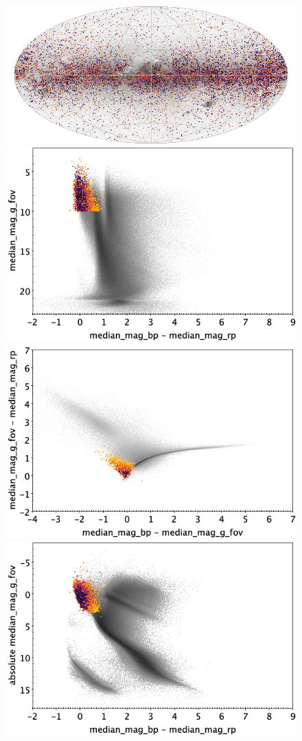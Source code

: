 \documentclass[longauth]{aa}
\begin{document}
\begin{appendix}
\begin{figure}
\centering
{}
\includegraphics[width=0.6\hsize]{figures/appendix/ACV_cls_sky.png} 
 \\ %
\vspace{4mm}
 \includegraphics[width=0.45\hsize]{figures/appendix/ACV_cls_cm.png}  %
\hspace{2mm}
 \includegraphics[width=0.45\hsize]{figures/appendix/ACV_cls_cc.png} \\ %
\vspace{4mm}
 \includegraphics[width=0.45\hsize]{figures/appendix/ACV_cls_cam.png}  %

\end{figure}
\end{appendix}
\end{document}
